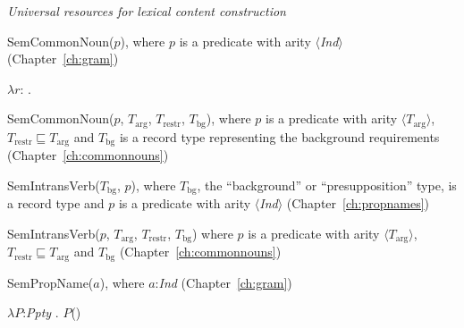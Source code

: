 \textit{Universal resources for lexical content construction}

SemCommonNoun($p$), where $p$ is a predicate with arity $\langle$\textit{Ind}$\rangle$ (Chapter~\ref{ch:gram})

$\lambda
r$:
. 

SemCommonNoun($p$,
$T_{\mathrm{arg}}$, $T_{\mathrm{restr}}$, $T_{\mathrm{bg}}$),
where $p$ is a predicate with arity $\langle T_{\mathrm{arg}}\rangle$,
$T_{\mathrm{restr}}\sqsubseteq T_{\mathrm{arg}}$ and
$T_{\mathrm{bg}}$ is a record type representing the background
requirements (Chapter~\ref{ch:commonnouns})


SemIntransVerb($T_{\mathrm{bg}}$, $p$), where $T_{\mathrm{bg}}$, the
``background'' or ``presupposition'' type, is a record type and $p$ is a predicate with arity $\langle$\textit{Ind}$\rangle$ (Chapter~\ref{ch:propnames})


SemIntransVerb($p$,
$T_{\mathrm{arg}}$, $T_{\mathrm{restr}}$, $T_{\mathrm{bg}}$) where $p$ is a predicate with arity $\langle T_{\mathrm{arg}}\rangle$,
$T_{\mathrm{restr}}\sqsubseteq T_{\mathrm{arg}}$ and
$T_{\mathrm{bg}}$ (Chapter~\ref{ch:commonnouns})



SemPropName($a$), where $a$:\textit{Ind} (Chapter~\ref{ch:gram})

$\lambda P$:\textit{Ppty} . $P$() 

